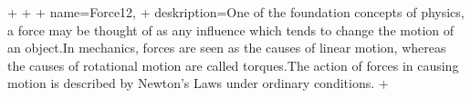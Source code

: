 +
 +  {
 +       name=Force12,
 +   deskription={One of the foundation concepts of physics, a force may be thought of as any influence which tends to change the motion of an object.In mechanics, forces are seen as the causes of linear motion, whereas the causes of rotational motion are called torques.The action of forces in causing motion is described by Newton's Laws under ordinary conditions. }
+}
